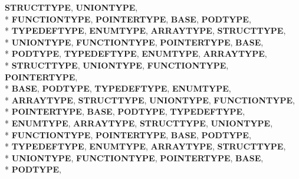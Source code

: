 \begin{DoxyCompactItemize}
{\bfseries S\-T\-R\-U\-C\-T\-T\-Y\-P\-E}, 
{\bfseries U\-N\-I\-O\-N\-T\-Y\-P\-E}, 
\\*
{\bfseries F\-U\-N\-C\-T\-I\-O\-N\-T\-Y\-P\-E}, 
{\bfseries P\-O\-I\-N\-T\-E\-R\-T\-Y\-P\-E}, 
{\bfseries B\-A\-S\-E}, 
{\bfseries P\-O\-D\-T\-Y\-P\-E}, 
\\*
{\bfseries T\-Y\-P\-E\-D\-E\-F\-T\-Y\-P\-E}, 
{\bfseries E\-N\-U\-M\-T\-Y\-P\-E}, 
{\bfseries A\-R\-R\-A\-Y\-T\-Y\-P\-E}, 
{\bfseries S\-T\-R\-U\-C\-T\-T\-Y\-P\-E}, 
\\*
{\bfseries U\-N\-I\-O\-N\-T\-Y\-P\-E}, 
{\bfseries F\-U\-N\-C\-T\-I\-O\-N\-T\-Y\-P\-E}, 
{\bfseries P\-O\-I\-N\-T\-E\-R\-T\-Y\-P\-E}, 
{\bfseries B\-A\-S\-E}, 
\\*
{\bfseries P\-O\-D\-T\-Y\-P\-E}, 
{\bfseries T\-Y\-P\-E\-D\-E\-F\-T\-Y\-P\-E}, 
{\bfseries E\-N\-U\-M\-T\-Y\-P\-E}, 
{\bfseries A\-R\-R\-A\-Y\-T\-Y\-P\-E}, 
\\*
{\bfseries S\-T\-R\-U\-C\-T\-T\-Y\-P\-E}, 
{\bfseries U\-N\-I\-O\-N\-T\-Y\-P\-E}, 
{\bfseries F\-U\-N\-C\-T\-I\-O\-N\-T\-Y\-P\-E}, 
{\bfseries P\-O\-I\-N\-T\-E\-R\-T\-Y\-P\-E}, 
\\*
{\bfseries B\-A\-S\-E}, 
{\bfseries P\-O\-D\-T\-Y\-P\-E}, 
{\bfseries T\-Y\-P\-E\-D\-E\-F\-T\-Y\-P\-E}, 
{\bfseries E\-N\-U\-M\-T\-Y\-P\-E}, 
\\*
{\bfseries A\-R\-R\-A\-Y\-T\-Y\-P\-E}, 
{\bfseries S\-T\-R\-U\-C\-T\-T\-Y\-P\-E}, 
{\bfseries U\-N\-I\-O\-N\-T\-Y\-P\-E}, 
{\bfseries F\-U\-N\-C\-T\-I\-O\-N\-T\-Y\-P\-E}, 
\\*
{\bfseries P\-O\-I\-N\-T\-E\-R\-T\-Y\-P\-E}, 
{\bfseries B\-A\-S\-E}, 
{\bfseries P\-O\-D\-T\-Y\-P\-E}, 
{\bfseries T\-Y\-P\-E\-D\-E\-F\-T\-Y\-P\-E}, 
\\*
{\bfseries E\-N\-U\-M\-T\-Y\-P\-E}, 
{\bfseries A\-R\-R\-A\-Y\-T\-Y\-P\-E}, 
{\bfseries S\-T\-R\-U\-C\-T\-T\-Y\-P\-E}, 
{\bfseries U\-N\-I\-O\-N\-T\-Y\-P\-E}, 
\\*
{\bfseries F\-U\-N\-C\-T\-I\-O\-N\-T\-Y\-P\-E}, 
{\bfseries P\-O\-I\-N\-T\-E\-R\-T\-Y\-P\-E}, 
{\bfseries B\-A\-S\-E}, 
{\bfseries P\-O\-D\-T\-Y\-P\-E}, 
\\*
{\bfseries T\-Y\-P\-E\-D\-E\-F\-T\-Y\-P\-E}, 
{\bfseries E\-N\-U\-M\-T\-Y\-P\-E}, 
{\bfseries A\-R\-R\-A\-Y\-T\-Y\-P\-E}, 
{\bfseries S\-T\-R\-U\-C\-T\-T\-Y\-P\-E}, 
\\*
{\bfseries U\-N\-I\-O\-N\-T\-Y\-P\-E}, 
{\bfseries F\-U\-N\-C\-T\-I\-O\-N\-T\-Y\-P\-E}, 
{\bfseries P\-O\-I\-N\-T\-E\-R\-T\-Y\-P\-E}, 
{\bfseries B\-A\-S\-E}, 
\\*
{\bfseries P\-O\-D\-T\-Y\-P\-E}, 

\end{DoxyCompactItemize}
